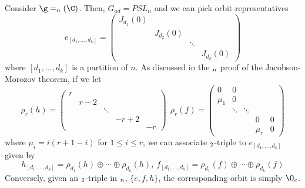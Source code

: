 \begin{example}
  Consider \(\g = \sl_n(\C)\). Then, \(G_{ad} = PSL_n\) and we can
  pick orbit representatives \[
    e_{[d_1, \ldots, d_k]} = \left(
      \begin{array}{cccc}
        J_{d_1}(0)&&& \\
                  &J_{d_2}(0)&& \\
                  &&\ddots& \\
        &&&J_{d_k}(0)
      \end{array}
\right)
\]
  where \([d_1, \ldots, d_k]\) is a partition of \(n\). As discussed
  in the \(\sl_n\) proof of the Jacobson-Morozov theorem, if we
  let \[
    \rho_r(h) = \left(
      \begin{array}{ccccc}
        r&&&&\\
         &r-2&&&\\
         &&\ddots&&\\
         &&&-r+2&\\
        &&&&-r
      \end{array}
\right) \ \ \rho_r(f) = \left(
  \begin{array}{ccccc}
    0&0&&&\\
    \mu_1&0&&&\\
     &\ddots&\ddots&& \\
     &&&0&0\\
    &&&\mu_r&0
  \end{array}
\right)
\]
  where \(\mu_i = i(r+1-i)\) for \(1 \leq i \leq r\), we can associate
  \(\sl_2\)-triple to \(e_{[d_1, \ldots, d_k]}\) given by \[
    h_{[d_1, \ldots, d_k]} = \rho_{d_1}(h) \oplus \cdots \oplus
    \rho_{d_k}(h), \ f_{[d_1, \ldots, d_k]} = \rho_{d_1}(f) \oplus
    \cdots \oplus \rho_{d_k}(f)
  \]
  Conversely, given an \(\sl_2\)-triple in \(\sl_n\), \(\{e,f,h\}\),
  the corresponding orbit is simply \(\O_e\).
\end{example}


